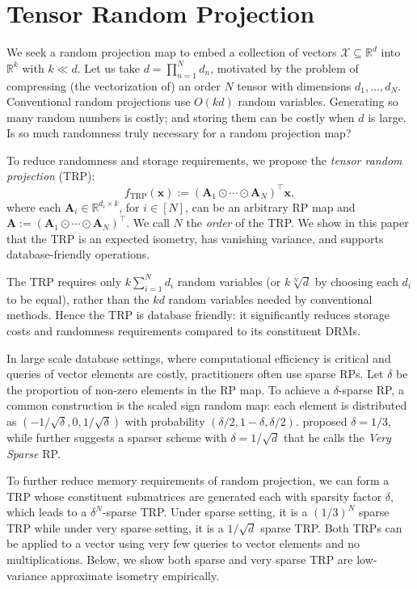 \section{Tensor Random Projection}
We seek a random projection map to embed a collection of vectors
$\mathcal X \subseteq \mathbb{R}^{d}$
into $\mathbb{R}^k$ with $k \ll d$.
Let us take $d = \prod_{n=1}^N d_n$, motivated by the problem of compressing
(the vectorization of) an order $N$ tensor with dimensions $d_1,\ldots,d_N$. Conventional random projections use $O(kd)$ random variables.
Generating so many random numbers is costly; and storing them can be costly when $d$ is large.
Is so much randomness truly necessary for a random projection map?

To reduce randomness and storage requirements, we propose
the \emph{tensor random projection} (TRP):
\begin{equation}
\label{eq:TRP}
f_{\text{TRP}}(\mathbf{x}):= (\mathbf{A}_1 \odot \cdots \odot \mathbf{A}_N)^\top
\mathbf{x},
\end{equation}
where each $\mathbf{A}_i \in \mathbb{R}^{d_i \times k}$, for $i \in [N]$,
can be an arbitrary RP map and
$\mathbf{A} := (\mathbf{A}_1 \odot \cdots \odot \mathbf{A}_N)^\top$.
We call $N$ the \emph{order} of the TRP.
We show in this paper that the TRP is an expected isometry,
has vanishing variance,
and supports database-friendly operations.

The TRP requires only $k\sum_{i = 1}^N d_i$ random variables
(or $k\sqrt[N]{d}$ by choosing each $d_i$ to be equal),
rather than the $kd$ random variables needed by conventional methods.
Hence the TRP is database friendly:
it significantly reduces storage costs and randomness requirements compared to its
constituent DRMs.

In large scale database settings,
where computational efficiency is critical and queries of vector elements are costly,
practitioners often use sparse RPs.
Let $\delta$ be the proportion of non-zero elements in the RP map.
To achieve a $\delta$-sparse RP, a common construction is the scaled sign random map:
each element is distributed as $(-1/\sqrt{\delta}, 0, 1/\sqrt{\delta})$ with probability
$(\delta/2, 1-\delta, \delta/2)$.
\cite{achlioptas2003database} proposed $\delta=1/3$,
while \cite{li2006very} further suggests a sparser scheme with
$\delta=1/\sqrt{d}$ that he calls the \textit{Very Sparse} RP.

To further reduce memory requirements of random projection,
we can form a TRP whose constituent submatrices
are generated each with sparsity factor $\delta$,
which leads to a $\delta^N$-sparse TRP. Under sparse setting, it is a $(1/3)^N$ sparse TRP while under very sparse setting, it is a $1/\sqrt{d}$ sparse TRP. 
Both TRPs can be applied to a vector using very few queries to vector elements
and no multiplications.
Below, we show both sparse and very sparse TRP are low-variance approximate isometry empirically. 
